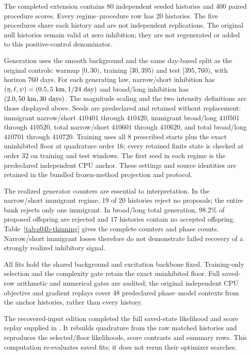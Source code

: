 The completed extension contains 80 independent seeded histories and 400 paired procedure scores. Every regime--procedure row has 20 histories. The five procedures share each history and are not independent replications. The original null histories remain valid at zero inhibition; they are not regenerated or added to this positive-control denominator.

Generation uses the smooth background and the same day-based split as the original controls: warmup $[0, 30)$, training $[30, 395)$ and test $[395, 760)$, with horizon $760$ days. For each generating law, narrow/short inhibition has $(\eta,\ell,\psi)=(0.5,5\ {\rm km},1/24\ {\rm day})$ and broad/long inhibition has $(2.0,50\ {\rm km},30\ {\rm days})$. The magnitude scaling and the two intensity definitions are those displayed above. Seeds are predeclared and retained without replacement: immigrant narrow/short $410401$ through $410420$, immigrant broad/long $410501$ through $410520$, total narrow/short $410601$ through $410620$, and total broad/long $410701$ through $410720$. Training uses all $8$ prescribed starts plus the exact uninhibited floor at quadrature order $16$; every retained finite state is checked at order $32$ on training and test windows. The first seed in each regime is the predeclared independent CPU anchor. These settings and source identities are retained in the bundled frozen-method projection and protocol.

The realized generator counters are essential to interpretation. In the narrow/short immigrant regime, 19 of 20 histories reject no proposals; the entire bank rejects only one immigrant. In broad/long total generation, 98.2\% of proposed offspring are rejected and 17 histories contain no accepted offspring. Table~\ref{tab:s04b-thinning} gives the complete counters and phase counts. Narrow/short immigrant losses therefore do not demonstrate failed recovery of a strongly realized inhibitory signal.

All fits hold the shared background and excitation backbone fixed. Training-only selection and the complexity gate retain the exact uninhibited floor. Full saved-row arithmetic and numerical gates are audited; the original independent CPU objective and gradient replays cover 48 predeclared phase--model contexts from the anchor histories, rather than every history.

The recovered-input edition completed the full saved-state likelihood and score
replay supplied in . It rebuilds quadrature from
the raw matched histories and reproduces the selected/floor likelihoods,
score contrasts and summary rows. This computation re-evaluates saved fits;
it does not rerun their optimizer searches.

